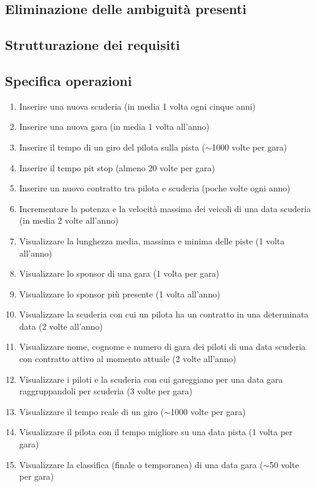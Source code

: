 \documentclass[11pt]{article}
\begin{document}
\subsection{Eliminazione delle ambiguità presenti}
\subsection{Strutturazione dei requisiti}
\subsection{Specifica operazioni}
\begin{enumerate}
    \item Inserire una nuova scuderia (in media 1 volta ogni cinque anni)
    \item Inserire una nuova gara (in media 1 volta all'anno)
    \item Inserire il tempo di un giro del pilota sulla pista ($\sim$1000 volte per gara)
    \item Inserire il tempo pit stop (almeno 20 volte per gara)
    \item Inserire un nuovo contratto tra pilota e scuderia (poche volte ogni anno)
    \item Incrementare la potenza e la velocità massima dei veicoli di una data scuderia (in media 2 volte all'anno)
    \item Visualizzare la lunghezza media, massima e minima delle piste (1 volta all'anno)
    \item Visualizzare lo sponsor di una gara (1 volta per gara)
    \item Visualizzare lo sponsor più presente (1 volta all'anno)
    \item Visualizzare la scuderia con cui un pilota ha un contratto in una determinata data (2 volte all'anno)
    \item Visualizzare nome, cognome e numero di gara dei piloti di una data scuderia con contratto attivo al momento attuale (2 volte all'anno)
    \item Visualizzare i piloti e la scuderia con cui gareggiano per una data gara raggruppandoli per scuderia (3 volte per gara)
    \item Visualizzare il tempo reale di un giro ($\sim$1000 volte per gara)
    \item Visualizzare il pilota con il tempo migliore su una data pista (1 volta per gara)
    \item Visualizzare la classifica (finale o temporanea) di una data gara ($\sim$50 volte per gara)

\end{enumerate}
\end{document}
